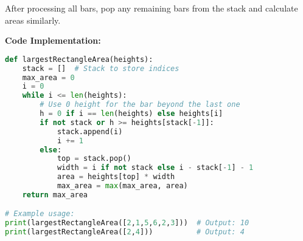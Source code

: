 After processing all bars, pop any remaining bars from the stack and calculate areas similarly.

\textbf{Code Implementation:}

\begin{lstlisting}[language=Python]
def largestRectangleArea(heights):
    stack = []  # Stack to store indices
    max_area = 0
    i = 0
    while i <= len(heights):
        # Use 0 height for the bar beyond the last one
        h = 0 if i == len(heights) else heights[i]
        if not stack or h >= heights[stack[-1]]:
            stack.append(i)
            i += 1
        else:
            top = stack.pop()
            width = i if not stack else i - stack[-1] - 1
            area = heights[top] * width
            max_area = max(max_area, area)
    return max_area

# Example usage:
print(largestRectangleArea([2,1,5,6,2,3]))  # Output: 10
print(largestRectangleArea([2,4]))          # Output: 4
\end{lstlisting}